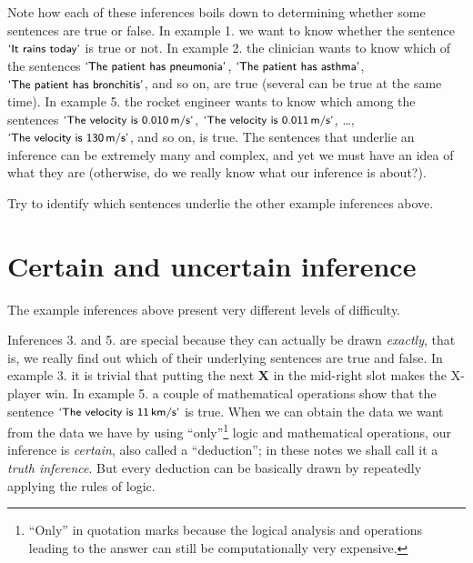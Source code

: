 \documentclass[
  a4paper,
  DIV=11,
  numbers=noendperiod,
  oneside]{scrreprt}
\begin{document}
Note how each of these inferences boils down to determining whether some
sentences are true or false. In example 1. we want to know whether the
sentence \(\textsf{\small`It rains today'}\) is true or not. In example
2. the clinician wants to know which of the sentences
\(\textsf{\small`The patient has pneumonia'}\),
\(\textsf{\small`The patient has asthma'}\),
\(\textsf{\small`The patient has bronchitis'}\), and so on, are true
(several can be true at the same time). In example 5. the rocket
engineer wants to know which among the sentences
\(\textsf{\small`The velocity is 0.010\,m/s'}\),
\(\textsf{\small`The velocity is 0.011\,m/s'}\), \ldots,
\(\textsf{\small`The velocity is 130\,m/s'}\), and so on, is true. The
sentences that underlie an inference can be extremely many and complex,
and yet we must have an idea of what they are (otherwise, do we really
know what our inference is about?).

\begin{tcolorbox}[enhanced jigsaw, arc=.35mm, colback=white, bottomrule=.15mm, bottomtitle=1mm, breakable, opacityback=0, toptitle=1mm, toprule=.15mm, rightrule=.15mm, colframe=quarto-callout-caution-color-frame, leftrule=.75mm, left=2mm, opacitybacktitle=0.6, titlerule=0mm, colbacktitle=quarto-callout-caution-color!10!white, title={Exercise}, coltitle=black]

Try to identify which sentences underlie the other example inferences
above.

\end{tcolorbox}

\hypertarget{certain-and-uncertain-inference}{%
\section{Certain and uncertain
inference}\label{certain-and-uncertain-inference}}

The example inferences above present very different levels of
difficulty.

Inferences 3. and 5. are special because they can actually be drawn
\emph{exactly}, that is, we really find out which of their underlying
sentences are true and false. In example 3. it is trivial that putting
the next {\textbf{X}} in the mid-right slot makes the X-player win. In
example 5. a couple of mathematical operations show that the sentence
\(\textsf{\small`The velocity is 11\,km/s'}\) is true. When we can
obtain the data we want from the data we have by using
``only''\footnote{``Only'' in quotation marks because the logical
  analysis and operations leading to the answer can still be
  computationally very expensive.} logic and mathematical operations,
our inference is \emph{certain}, also called a ``deduction''; in these
notes we shall call it a \emph{truth inference}. But every deduction can
be basically drawn by repeatedly applying the rules of logic.
\end{document}
